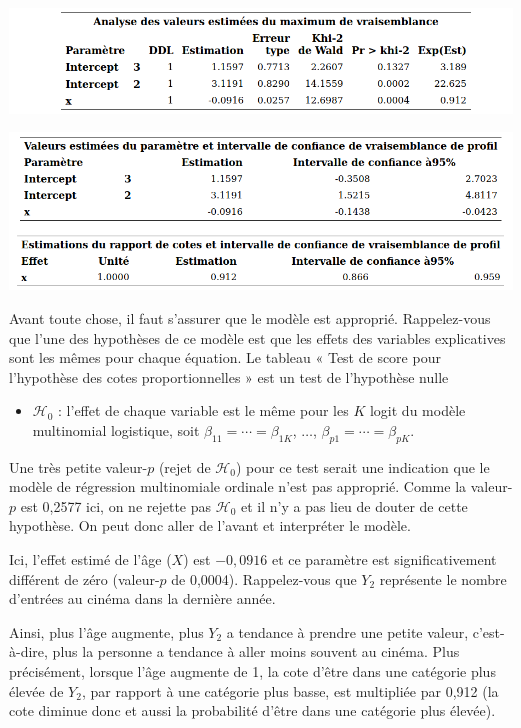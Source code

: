 \documentclass[
  11pt,
  letterpaper,
]{book}
\providecommand{\tightlist}{%
  \setlength{\itemsep}{0pt}\setlength{\parskip}{0pt}}
\theoremstyle{definition}
\theoremstyle{definition}
\theoremstyle{definition}
\theoremstyle{remark}
\begin{document}
\begin{center}\includegraphics[width=0.8\linewidth]{figures/03-logistic-e29} \end{center}

\begin{center}\includegraphics[width=0.8\linewidth]{figures/03-logistic-e30} \end{center}

Avant toute chose, il faut s'assurer que le modèle est approprié. Rappelez-vous que l'une des hypothèses de ce modèle est que les effets des variables explicatives sont les mêmes pour chaque équation. Le tableau « Test de score pour l'hypothèse des cotes proportionnelles » est un test de l'hypothèse nulle

\begin{itemize}
\tightlist
\item
  \(\mathcal{H}_0\) : l'effet de chaque variable est le même pour les \(K\) logit du modèle multinomial logistique, soit \(\beta_{11} = \cdots =\beta_{1K}\), \(\ldots\), \(\beta_{p1} = \cdots =\beta_{pK}\).
\end{itemize}

Une très petite valeur-\(p\) (rejet de \(\mathcal{H}_0\)) pour ce test serait une indication que le modèle de régression multinomiale ordinale n'est pas approprié. Comme la valeur-\(p\) est 0,2577 ici, on ne rejette pas \(\mathcal{H}_0\) et il n'y a pas lieu de douter de cette hypothèse. On peut donc aller de l'avant et interpréter le modèle.

Ici, l'effet estimé de l'âge (\(X\)) est \(-{0,0916}\) et ce paramètre est significativement différent de zéro (valeur-\(p\) de 0,0004). Rappelez-vous que \(Y_2\) représente le nombre d'entrées au cinéma dans la dernière année.

Ainsi, plus l'âge augmente, plus \(Y_2\) a tendance à prendre une petite valeur, c'est-à-dire, plus la personne a tendance à aller moins souvent au cinéma. Plus précisément, lorsque l'âge augmente de 1, la cote d'être dans une catégorie plus élevée de \(Y_2\), par rapport à une catégorie plus basse, est multipliée par 0,912 (la cote diminue donc et aussi la probabilité d'être dans une catégorie plus élevée).
\end{document}
